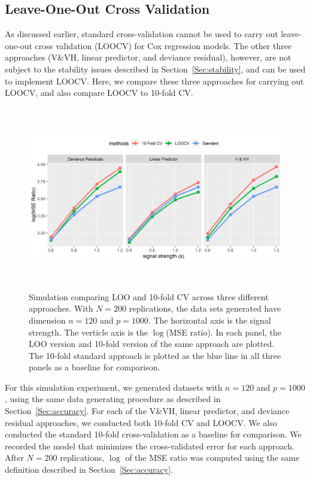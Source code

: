 \subsection {Leave-One-Out Cross Validation}
\label{Sec:loocv}


As discussed earlier, standard cross-validation cannot be used to carry out leave-one-out cross validation (LOOCV) for Cox regression models. The other three approaches (V\&VH, linear predictor, and deviance residual), however, are not subject to the stability issues described in Section~\ref{Sec:stability}, and can be used to implement LOOCV.  Here, we compare these three approaches for carrying out LOOCV, and also compare LOOCV to 10-fold CV.

\begin{figure}[h]
  \centering
  \includegraphics[height= 8cm ]{./manuscript_figure/figure_4.png}
  \caption{\label{Fig:loocv}Simulation comparing LOO and 10-fold CV across three different approaches. With $N = 200$ replications, the data sets generated have dimension $n = 120$ and $p = 1000$. The horizontal axis is the signal strength. The verticle axis is the $\log$(MSE ratio). In each panel, the LOO version and 10-fold version of the same approach are plotted. The 10-fold standard approach is plotted as the blue line in all three panels as a baseline for comparison. }
\end{figure}	

For this simulation experiment, we generated datasets with $n = 120$ and $p = 1000$, using the same data generating procedure as described in Section~\ref{Sec:accuracy}. For each of the V\&VH, linear predictor, and deviance residual approaches, we conducted both 10-fold CV and LOOCV. We also conducted the standard 10-fold cross-validation as a baseline for comparison. We recorded the model that minimizes the cross-validated error  for each approach. After $N = 200$ replications, $\log$ of the MSE ratio was computed using the same definition described in Section~\ref{Sec:accuracy}.

